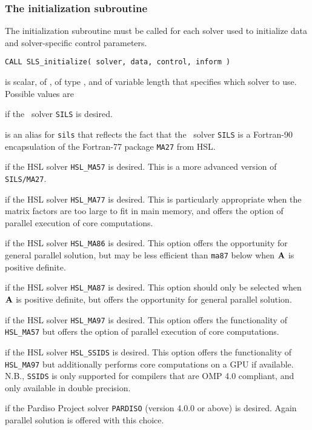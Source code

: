 \documentclass{galahad}
\newcommand{\packagename}{SLS}
\begin{document}
\subsubsection{The initialization subroutine}\label{subinit}
The initialization subroutine must be called for each solver used
to initialize data and solver-specific control parameters.

\hskip0.5in
{\tt CALL \packagename\_initialize( solver, data, control, inform )}
\begin{description}

 is scalar, of \intentin, of type \character, and of variable
length that specifies which solver to use. Possible values are
\begin{description}
 if the \galahad\ solver {\tt SILS} is desired.

 is an alias for {\tt sils} that reflects the fact that the \galahad\
 solver {\tt SILS} is a Fortran-90 encapsulation of the Fortran-77
 package {\tt MA27} from HSL.

 if the HSL solver {\tt HSL\_MA57} is desired. This is a more
advanced version of {\tt SILS/MA27}.

 if the HSL solver {\tt HSL\_MA77} is desired. This is particularly
appropriate when the matrix factors are too large to fit in main memory,
and offers the option of parallel execution of core computations.

 if the HSL solver {\tt HSL\_MA86} is desired. This option
offers the opportunity for general parallel solution, but may be
less efficient than {\tt ma87} below when ${\mathbf{A}}$ is positive definite.

 if the HSL solver {\tt HSL\_MA87} is desired. This option should
only be selected when ${\mathbf{A}}$ is positive definite, but
offers the opportunity for general parallel solution.

 if the HSL solver {\tt HSL\_MA97} is desired. This option offers
the functionality of {\tt HSL\_MA57} but offers the option of parallel
execution of core computations.

 if the HSL solver {\tt HSL\_SSIDS} is desired. This option offers
the functionality of {\tt HSL\_MA97} but additionally performs
core computations on a GPU if available. N.B., {\tt SSIDS} is only
supported for compilers that are OMP 4.0 compliant, and only available
in double precision.

 if the Pardiso Project solver {\tt PARDISO} (version 4.0.0
or above) is desired. Again parallel solution is offered with this choice.


\end{description}
\end{description}
\end{document}
